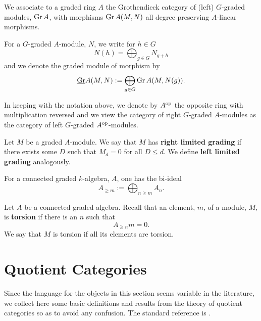 \begin{definition}
  We associate to a graded ring \(A\) the Grothendieck category of (left) \(G\)-graded modules, \(\operatorname{Gr}A\), with morphisms \(\operatorname{Gr}A(M,N)\) all degree preserving \(A\)-linear morphisms.

  For a \(G\)-graded \(A\)-module, \(N\), we write for \(h \in G\)
  \[N(h) = \bigoplus_{g \in G} N_{g + h}\]
  and we denote the graded module of morphism by
  \[\underline{\operatorname{Gr}}A(M,N) := \bigoplus_{g \in G} \operatorname{Gr}A(M,N(g)).\]
\end{definition}

\begin{remark}
  In keeping with the notation above, we denote by \(A^{\operatorname{op}}\) the opposite ring with multiplication reversed and we view the category of right \(G\)-graded \(A\)-modules as the category of left \(G\)-graded \(A^{\operatorname{op}}\)-modules.
\end{remark}

\begin{definition}
  Let \(M\) be a graded \(A\)-module. We say that \(M\) has \textbf{right limited grading} if there exists some \(D\) such that \(M_{d} = 0\) for all \(D \leq d\). We define \textbf{left limited grading} analogously.
\end{definition}

For a connected graded \(k\)-algebra, \(A\), one has the bi-ideal
\begin{displaymath}
  A_{\geq m} :=  \bigoplus_{n\geq m} A_n.
\end{displaymath}

\begin{definition}
  Let \(A\) be a connected graded algebra. Recall that an element, \(m\), of a module, \(M\), is \textbf{torsion} if there is an \(n\) such that
  \begin{displaymath}
    A_{\geq n} m = 0.
  \end{displaymath}
  We say that \(M\) is torsion if all its elements are torsion.
\end{definition}

\section{Quotient Categories}

Since the language for the objects in this section seems variable in the literature, we collect here some basic definitions and results from the theory of quotient categories so as to avoid any confusion.
The standard reference is \cite{DCA62}.

